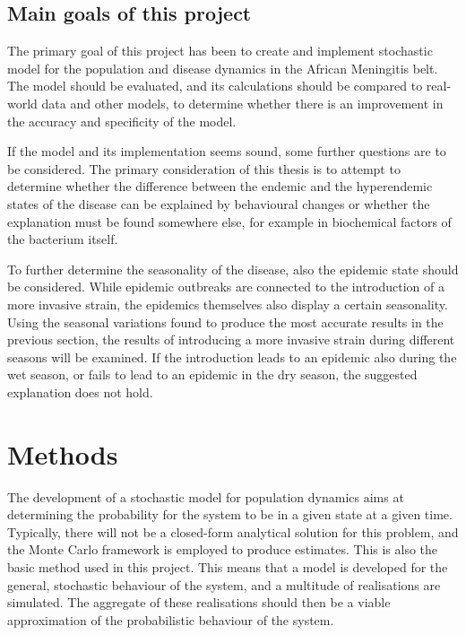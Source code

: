 \documentclass[10pt,a4paper]{article}
\begin{document}
\subsection{Main goals of this project}

The primary goal of this project has been to create and implement stochastic model for the population and disease dynamics in the African Meningitis belt. The model should be evaluated, and its calculations should be compared to real-world data and other models, to determine whether there is an improvement in the accuracy and specificity of the model.

If the model and its implementation seems sound, some further questions are to be considered. The primary consideration of this thesis is to attempt to determine whether the difference between the endemic and the hyperendemic states of the disease can be explained by behavioural changes or whether the explanation must be found somewhere else, for example in biochemical factors of the bacterium itself.

To further determine the seasonality of the disease, also the epidemic state should be considered. While epidemic outbreaks are connected to the introduction of a more invasive strain, the epidemics themselves also display a certain seasonality. Using the seasonal variations found to produce the most accurate results in the previous section, the results of introducing a more invasive strain during different seasons will be examined. If the introduction leads to an epidemic also during the wet season, or fails to lead to an epidemic in the dry season, the suggested explanation does not hold.



\section{Methods}

The development of a stochastic model for population dynamics aims at determining the probability for the system to be in a given state at a given time. Typically, there will not be a closed-form analytical solution for this problem, and the Monte Carlo framework is employed to produce estimates. This is also the basic method used in this project. This means that a model is developed for the general, stochastic behaviour of the system, and a multitude of realisations are simulated. The aggregate of these realisations should then be a viable approximation of the probabilistic behaviour of the system.
\end{document}
